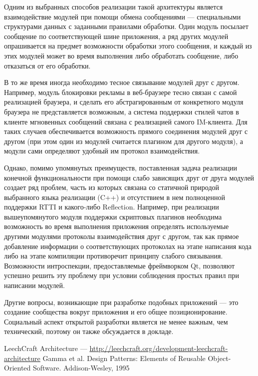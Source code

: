 \documentclass[10pt, a5paper]{article}
\begin{document}
Одним из выбранных способов реализации такой архитектуры является
взаимодействие модулей при помощи обмена сообщениями --- специальными
структурами данных с заданными правилами обработки. Один модуль
посылает сообщение по соответствующей шине приложения, а ряд других
модулей опрашивается на предмет возможности обработки этого сообщения,
и каждый из этих модулей может во время выполнения либо обработать
сообщение, либо отказаться от его обработки.

В то же время иногда необходимо тесное связывание модулей друг с
другом. Например, модуль блокировки рекламы в веб-браузере тесно
связан с самой реализацией браузера, и сделать его абстрагированным от
конкретного модуля браузера не представляется возможным, а система
поддержки стилей чатов в клиенте мгновенных сообщений связана с
реализацией самого IM-клиента. Для таких случаев обеспечивается
возможность прямого соединения модулей друг с другом (при этом один из
модулей считается плагином для другого модуля), а модули сами
определяют удобный им протокол взаимодействия.

Однако, помимо упомянутых преимуществ, поставленная задача
реализации конечной функциональности при помощи слабо зависящих друг
от друга модулей создает ряд проблем, часть из которых связана со
статичной природой выбранного языка реализации (C++) и отсутствием в
нем полноценной поддержки RTTI и какого-либо Reflection. Например, при
реализации вышеупомянутого модуля поддержки скриптовых плагинов
необходима возможность во время выполнения приложения определять
используемые другими модулями протоколы взаимодействия друг с другом,
так как прямое добавление информации о соответствующих протоколах на
этапе написания кода либо на этапе компиляции противоречит принципу
слабого связывания. Возможности интроспекции, предоставляемые
фреймворком Qt, позволяют успешно решить эту проблему при условии
соблюдения простых правил при написании модулей.

Другие вопросы, возникающие при разработке подобных приложений --- это
создание сообщества вокруг приложения и его общее позиционирование.
Социальный аспект открытой разработки является не менее важным, чем
технический, поэтому он также обсуждается в докладе.

\begin{thebibliography}{9}
	 LeechCraft Architecture --- \url{http://leechcraft.org/development-leechcraft-architecture}
	 Gamma et al. Design Patterns: Elements of Reusable Object-Oriented Software. Addison-Wesley, 1995
\end{thebibliography}
\end{document}
